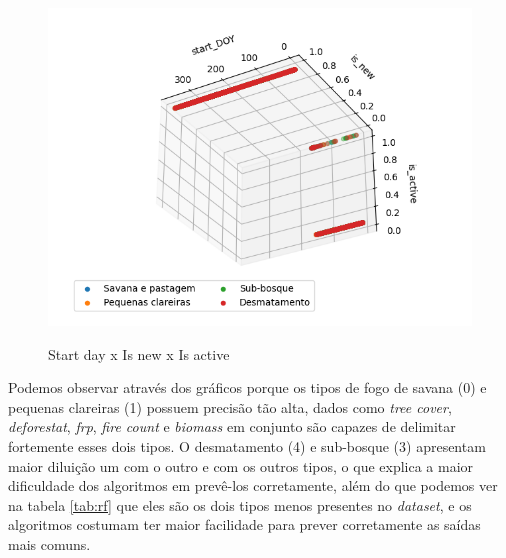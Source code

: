 \begin{multicols}{2}
\begin{figure}[H]
    \caption{Start day x Is new x Is active}
     
    \centering 
    \includegraphics[width=1.1\linewidth]{tg1/figuras/start_DOYxis_newxis_active--30-120.png}
    \label{figura:seven}
\end{figure}
            
\end{multicols}

Podemos observar através dos gráficos porque os tipos de fogo de savana (0) e pequenas clareiras (1) possuem precisão tão alta, dados como \textit{tree cover}, \textit{deforestat}, \textit{frp}, \textit{fire count} e \textit{biomass} em conjunto são capazes de delimitar fortemente esses dois tipos. O desmatamento (4) e sub-bosque (3) apresentam maior diluição um com o outro e com os outros tipos, o que explica a maior dificuldade dos algoritmos em prevê-los corretamente, além do que podemos ver na tabela \ref{tab:rf} que eles são os dois tipos menos presentes no \textit{dataset}, e os algoritmos costumam ter maior facilidade para prever corretamente as saídas mais comuns.



